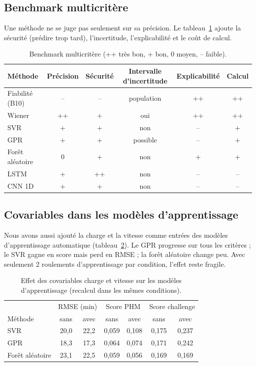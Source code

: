\subsection{Benchmark multicritère}
Une méthode ne se juge pas seulement sur sa précision. Le tableau~\ref{tab:benchmark} ajoute la sécurité (prédire trop tard), l'incertitude, l'explicabilité et le coût de calcul.

\begin{table}[H]
\centering\small
\begin{tabular}{lccccc}
\toprule
Méthode & Précision & Sécurité & Intervalle d'incertitude & Explicabilité & Calcul \\
\midrule
Fiabilité (B10) & -- & -- & population & ++ & ++ \\
Wiener & ++ & + & oui & ++ & ++ \\
SVR & + & + & non & -- & + \\
GPR & + & + & possible & -- & + \\
Forêt aléatoire & 0 & + & non & + & + \\
LSTM & + & ++ & non & -- & -- \\
CNN 1D & + & + & non & -- & -- \\
\bottomrule
\end{tabular}
\caption[Benchmark multicritère]{Benchmark multicritère (++ très bon, + bon, 0 moyen, -- faible).}
\label{tab:benchmark}
\end{table}

\subsection{Covariables dans les modèles d'apprentissage}
Nous avons aussi ajouté la charge et la vitesse comme entrées des modèles d'apprentissage automatique (tableau~\ref{tab:covml}). Le GPR progresse sur tous les critères ; le SVR gagne en score mais perd en RMSE ; la forêt aléatoire change peu. Avec seulement 2 roulements d'apprentissage par condition, l'effet reste fragile.

\begin{table}[H]
\centering\small
\begin{tabular}{lcccccc}
\toprule
& \multicolumn{2}{c}{RMSE (min)} & \multicolumn{2}{c}{Score PHM} & \multicolumn{2}{c}{Score challenge} \\
Méthode & sans & avec & sans & avec & sans & avec \\
\midrule
SVR & 20,0 & 22,2 & 0,059 & 0,108 & 0,175 & 0,237 \\
GPR & 18,3 & 17,3 & 0,064 & 0,074 & 0,171 & 0,242 \\
Forêt aléatoire & 23,1 & 22,5 & 0,059 & 0,056 & 0,169 & 0,169 \\
\bottomrule
\end{tabular}
\caption[Covariables dans les modèles d'apprentissage]{Effet des covariables charge et vitesse sur les modèles d'apprentissage (recalcul dans les mêmes conditions).}
\label{tab:covml}
\end{table}

